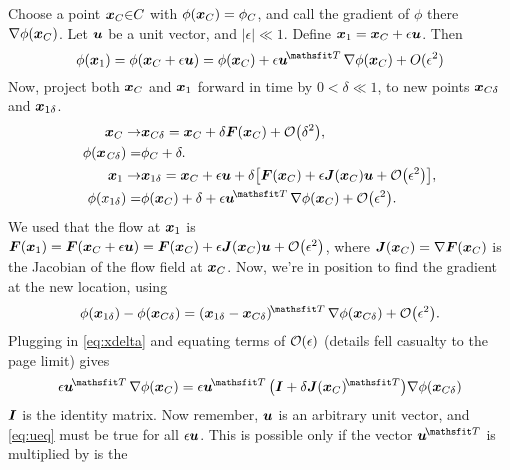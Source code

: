 Choose a point  ${\vb{x}}_{C}{\in}C$ with
$\phi({\vb{x}}_{C})={\phi}_{C}$, and call the gradient of  $\phi$
there  ${\nabla}\phi({\vb{x}}_{C})$. Let  $\vb{u}$ be a unit vector, and
$|\epsilon|{\ll}1$. Define
${\vb{x}}_{1}={\vb{x}}_{C}+\epsilon\vb{u}$. Then  
\begin{equation}
\phi ({\vb{x}}_{1})=\phi({\vb{x}}_{C}+\epsilon\vb{u})
=\phi({\vb{x}}_{C}) + \epsilon{\vb{u}}^{\T}\,{\nabla}\phi
({\vb{x}}_{C})+O({\epsilon }^{2})
\end{equation}
Now, project both  $\vb{x}_{C}$ and  $\vb{x}_{1}$ forward in time by 
$0<\delta\ll1$, to new points  $\vb{x}_{C\delta}$ and 
$\vb{x}_{1\delta}$. 
\begin{equation}\label{eq:xdelta}
\begin{aligned}
{\vb{x}}_{C}\to& \vb{x}_{C\delta}
=\vb{x}_{C}+\delta\vb{F}({\vb{x}}_{C})+\order{\delta^2},\\
\phi({\vb{x}}_{\mathit{C\delta }})=&{\phi}_{C}+\delta. \\
\vb{x}_1\to& \vb{x}_{1\delta}
 =\vb{x}_{C}+\epsilon \vb{u}+
  \delta\qty[\vb{F}(\vb{x}_{C})+\epsilon \vb{J}(\vb{x}_{C})\vb{u}
  +\order{\epsilon^2}],\\
\phi({x}_{1\delta })=&\phi(\vb{x}_{C}) + \delta 
 +\epsilon {\vb{u}}^{\T}\,{\nabla}\phi(\vb{x}_{C})
 +\order{\epsilon^2}.
\end{aligned}
\end{equation}
We used that the flow at  $\vb{x}_{1}$ is 
$\vb{F}(\vb{x}_{1})
=\vb{F}(\vb{x}_{C}+\epsilon\vb{u})
=\vb{F}(\vb{x}_{C})+\epsilon\vb{J}(\vb{x}_{C})\vb{u}+\order{\epsilon^2}$, where 
$\vb{J}(\vb{x}_{C})={\nabla}\vb{F}(\vb{x}_{C})$ is the Jacobian of the
flow field at  $\vb{x}_{C}$. Now, we're in position to find the gradient
at the new location, using
\begin{equation}
\phi(\vb{x}_{1\delta })-\phi(\vb{x}_{C\delta})
=(\vb{x}_{1\delta }-\vb{x}_{C\delta})^{\T}\,
{\nabla}\phi(\vb{x}_{C\delta})+\order{\epsilon^2}.
\end{equation}
Plugging in \eqref{eq:xdelta} and equating terms of  $\order{\epsilon}$ 
(details fell casualty to the page limit) gives
\begin{equation}\label{eq:ueq}
\epsilon {\vb{u}}^{\T}\,{\nabla}\phi(\vb{x}_{C})=\epsilon
{\vb{u}}^{\T}\,\qty(\I+\delta\vb{J}(\vb{x}_{C})^{\T})
{\nabla}\phi(\vb{x}_{C\delta})
\end{equation}
$\I$ is the identity matrix. Now remember, $\vb{u}$ is an
arbitrary unit vector, and \eqref{eq:ueq} must be true for all  $\epsilon\vb{u}$. This
is possible only if the vector  ${\vb{u}}^{\T}$ is multiplied by is the
